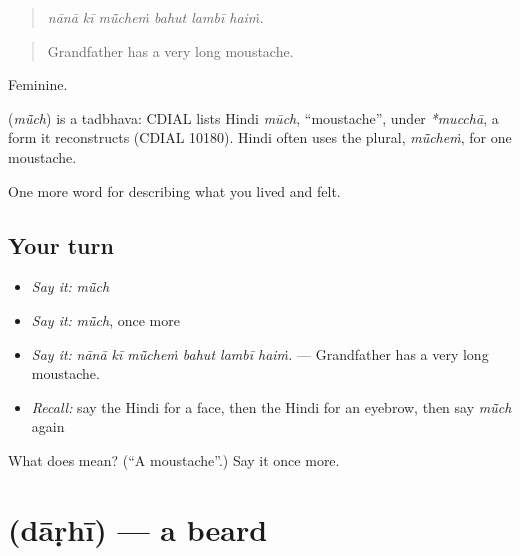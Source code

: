 \begin{quote}
     
\end{quote}

\begin{quote}
\emph{nānā kī mū̃cheṁ bahut lambī haiṁ.}
\end{quote}

\begin{quote}
Grandfather has a very long moustache.
\end{quote}

Feminine.

\begin{cousinweb}
\textbf{} (\emph{mū̃ch}) is a tadbhava: CDIAL lists Hindi \emph{mūch}, \textquotedblleft{}moustache\textquotedblright{}, under \emph{*mucchā}, a form it reconstructs (CDIAL 10180). Hindi often uses the plural, \emph{mū̃cheṁ}, for one moustache.
\end{cousinweb}

\begin{grammarlens}[title={What you've built}]
One more word for describing what you lived and felt.
\end{grammarlens}

\subsection*{Your turn}
\begin{itemize}
\raggedright
  \item \emph{Say it:} \emph{mū̃ch}
  \item \emph{Say it:} \emph{mū̃ch}, once more
  \item \emph{Say it:} \emph{nānā kī mū̃cheṁ bahut lambī haiṁ.} — Grandfather has a very long moustache.
  \item \emph{Recall:} say the Hindi for a face, then the Hindi for an eyebrow, then say \emph{mū̃ch} again
\end{itemize}

\begin{tcolorbox}[breakable,colback=teal!4,colframe=teal!35!black,title={Before you move on}]
What does  mean? (\textquotedblleft{}A moustache\textquotedblright{}.) Say it once more.
\end{tcolorbox}
\section[\texorpdfstring{\hi{दाढ़ी} (dāṛhī)}{दाढ़ी (dāṛhī)}]{ (dāṛhī) — a beard}

